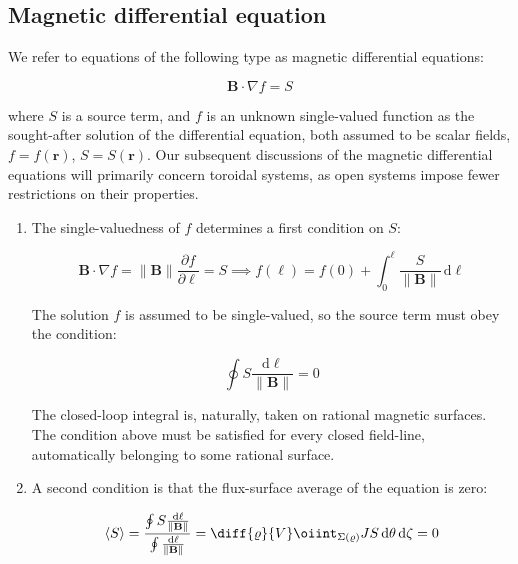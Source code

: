 \subsection{Magnetic differential equation}

\label{subsec-5-5-3}

We refer to equations of the following type as magnetic differential equations:

\begin{equation}
    \mathbf{B}\cdot\nabla f=S
\end{equation}

where $S$ is a source term, and $f$ is an unknown single-valued function as the sought-after solution of the differential equation, both assumed to be scalar fields, $f=f(\mathbf{r})$, $S=S(\mathbf{r})$. Our subsequent discussions of the magnetic differential equations will primarily concern toroidal systems, as open systems impose fewer restrictions on their properties.

\begin{enumerate}
    \item The single-valuedness of $f$ determines a first condition on $S$:

    \begin{equation}
        \mathbf{B}\cdot\nabla f=\|\mathbf{B}\|\frac{\partial f}{\partial\ell}=S\implies f(\ell)=f(0)+\int_0^\ell\frac{S}{\|\mathbf{B}\|}\,\mathrm{d}\ell
    \end{equation}

    The solution $f$ is assumed to be single-valued, so the source term must obey the condition:

    \begin{equation}
        \label{magnetic-diff-eq-condition-1}
        \oint S\frac{\mathrm{d}\ell}{\|\mathbf{B}\|}=0
    \end{equation}

    The closed-loop integral is, naturally, taken on rational magnetic surfaces. The condition above must be satisfied for every closed field-line, automatically belonging to some rational surface.

    \item A second condition is that the flux-surface average of the equation is zero:
    
    \begin{equation}
        \label{magnetic-diff-eq-condition-2}
        \langle S\rangle=\frac{\oint S\frac{\mathrm{d}\ell}{\|\mathbf{B}\|}}{\oint\frac{\mathrm{d}\ell}{\|\mathbf{B}\|}}=\diff{\varrho}{V}\oiint_{\Sigma(\varrho)}JS\,\mathrm{d}\theta\,\mathrm{d}\zeta=0
    \end{equation}
    
    \end{enumerate}

